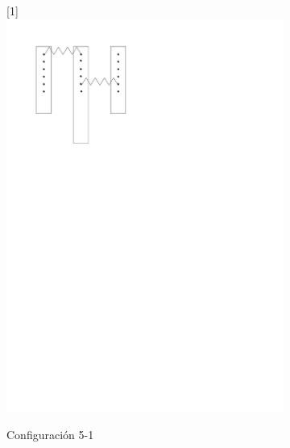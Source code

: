\begin{figure}[htbp!]
	\centering
	\begin{subfigure}[b]{0.3\textwidth}
		\centering
		\scalebox{-1}[1]{\includegraphics[width=\linewidth]{./Figures/15.pdf}}
		\caption{Configuración 5-1}
		\label{fig:conf-1-5}
	\end{subfigure}
	\hfill
	\begin{subfigure}[b]{0.3\textwidth}
		\centering

\end{subfigure}
\end{figure}
